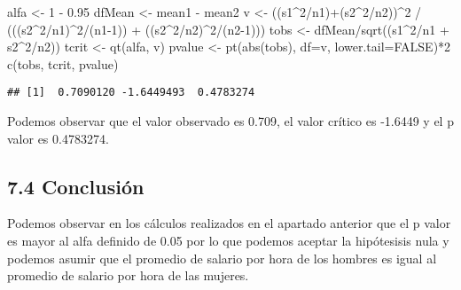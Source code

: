 \documentclass[
  a4paper]{article}
\newenvironment{Shaded}{\begin{snugshade}}{\end{snugshade}}
\newcommand{\AttributeTok}[1]{\textcolor[rgb]{0.77,0.63,0.00}{#1}}
\newcommand{\ConstantTok}[1]{\textcolor[rgb]{0.00,0.00,0.00}{#1}}
\newcommand{\DecValTok}[1]{\textcolor[rgb]{0.00,0.00,0.81}{#1}}
\newcommand{\FloatTok}[1]{\textcolor[rgb]{0.00,0.00,0.81}{#1}}
\newcommand{\FunctionTok}[1]{\textcolor[rgb]{0.00,0.00,0.00}{#1}}
\newcommand{\NormalTok}[1]{#1}
\newcommand{\OtherTok}[1]{\textcolor[rgb]{0.56,0.35,0.01}{#1}}
\newcommand{\SpecialCharTok}[1]{\textcolor[rgb]{0.00,0.00,0.00}{#1}}
\begin{document}
\begin{Shaded}
\begin{Highlighting}[]
\NormalTok{alfa }\OtherTok{\textless{}{-}} \DecValTok{1} \SpecialCharTok{{-}} \FloatTok{0.95}
\NormalTok{dfMean }\OtherTok{\textless{}{-}}\NormalTok{ mean1 }\SpecialCharTok{{-}}\NormalTok{ mean2}
\NormalTok{v }\OtherTok{\textless{}{-}}\NormalTok{ ((s1}\SpecialCharTok{\^{}}\DecValTok{2}\SpecialCharTok{/}\NormalTok{n1)}\SpecialCharTok{+}\NormalTok{(s2}\SpecialCharTok{\^{}}\DecValTok{2}\SpecialCharTok{/}\NormalTok{n2))}\SpecialCharTok{\^{}}\DecValTok{2} \SpecialCharTok{/}\NormalTok{ (((s2}\SpecialCharTok{\^{}}\DecValTok{2}\SpecialCharTok{/}\NormalTok{n1)}\SpecialCharTok{\^{}}\DecValTok{2}\SpecialCharTok{/}\NormalTok{(n1}\DecValTok{{-}1}\NormalTok{)) }\SpecialCharTok{+}\NormalTok{ ((s2}\SpecialCharTok{\^{}}\DecValTok{2}\SpecialCharTok{/}\NormalTok{n2)}\SpecialCharTok{\^{}}\DecValTok{2}\SpecialCharTok{/}\NormalTok{(n2}\DecValTok{{-}1}\NormalTok{)))}
\NormalTok{tobs }\OtherTok{\textless{}{-}}\NormalTok{ dfMean}\SpecialCharTok{/}\FunctionTok{sqrt}\NormalTok{((s1}\SpecialCharTok{\^{}}\DecValTok{2}\SpecialCharTok{/}\NormalTok{n1 }\SpecialCharTok{+}\NormalTok{ s2}\SpecialCharTok{\^{}}\DecValTok{2}\SpecialCharTok{/}\NormalTok{n2))}
\NormalTok{tcrit }\OtherTok{\textless{}{-}} \FunctionTok{qt}\NormalTok{(alfa, v)}
\NormalTok{pvalue }\OtherTok{\textless{}{-}} \FunctionTok{pt}\NormalTok{(}\FunctionTok{abs}\NormalTok{(tobs), }\AttributeTok{df=}\NormalTok{v, }\AttributeTok{lower.tail=}\ConstantTok{FALSE}\NormalTok{)}\SpecialCharTok{*}\DecValTok{2}
\FunctionTok{c}\NormalTok{(tobs, tcrit, pvalue)}
\end{Highlighting}
\end{Shaded}

\begin{verbatim}
## [1]  0.7090120 -1.6449493  0.4783274
\end{verbatim}

Podemos observar que el valor observado es 0.709, el valor crítico es
-1.6449 y el p valor es 0.4783274.

\hypertarget{conclusiuxf3n-4}{%
\subsection{7.4 Conclusión}\label{conclusiuxf3n-4}}

Podemos observar en los cálculos realizados en el apartado anterior que
el p valor es mayor al alfa definido de 0.05 por lo que podemos aceptar
la hipótesisis nula y podemos asumir que el promedio de salario por hora
de los hombres es igual al promedio de salario por hora de las mujeres.
\end{document}
